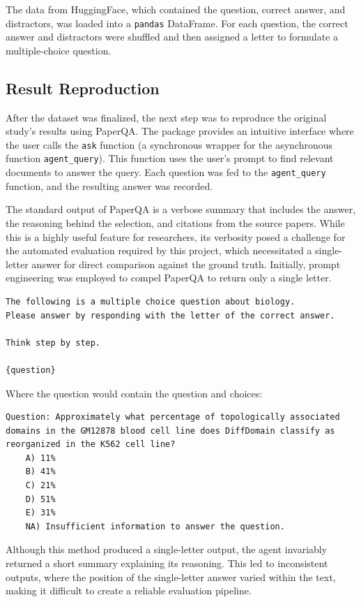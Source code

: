 The data from HuggingFace, which contained the question, correct answer, and distractors, was loaded into a \texttt{pandas} DataFrame. For each question, the correct answer and distractors were shuffled and then assigned a letter to formulate a multiple-choice question.

\subsection{Result Reproduction}
After the dataset was finalized, the next step was to reproduce the original study's results using PaperQA.
The package provides an intuitive interface where the user calls the \texttt{ask} function (a synchronous wrapper for the asynchronous function \texttt{agent\_query}). This function uses the user's prompt to find relevant documents to answer the query. Each question was fed to the \texttt{agent\_query} function, and the resulting answer was recorded.

The standard output of PaperQA is a verbose summary that includes the answer, the reasoning behind the selection, and citations from the source papers. While this is a highly useful feature for researchers, its verbosity posed a challenge for the automated evaluation required by this project, which necessitated a single-letter answer for direct comparison against the ground truth. Initially, prompt engineering was employed to compel PaperQA to return only a single letter.\\

\begin{verbatim}
The following is a multiple choice question about biology.
Please answer by responding with the letter of the correct answer.

Think step by step.

{question}
\end{verbatim}

Where the question would contain the question and choices:

\begin{verbatim}
Question: Approximately what percentage of topologically associated 
domains in the GM12878 blood cell line does DiffDomain classify as 
reorganized in the K562 cell line? 
    A) 11%
    B) 41%
    C) 21%
    D) 51%
    E) 31%
    NA) Insufficient information to answer the question.
\end{verbatim}


Although this method produced a single-letter output, the agent invariably returned a short summary explaining its reasoning. 
This led to inconsistent outputs, where the position of the single-letter answer varied within the text, making it difficult to create a reliable evaluation pipeline. \\

